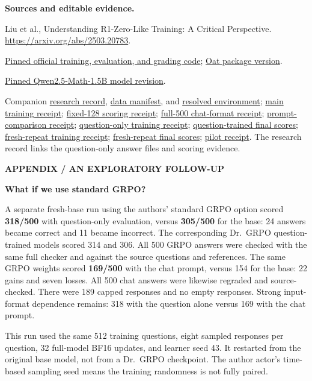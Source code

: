 \documentclass[11pt]{article}
\newcommand{\pagetitle}[2]{{\small\color{accent}\textbf{#1}}\par
  {\LARGE\color{ink}\textbf{#2}}\par\medskip}
\begin{document}
\smallskip
{\footnotesize
\textbf{Sources and editable evidence.}\par
[1] Liu et al., Understanding R1-Zero-Like Training: A Critical Perspective.
\url{https://arxiv.org/abs/2503.20783}.\par
[2] \href{https://github.com/sail-sg/understand-r1-zero/tree/dfca49dd460ee7cc8e4a5a162c876a7fd6993b87}{Pinned official training, evaluation, and grading code};
\href{https://pypi.org/project/oat-llm/0.1.3.post1/}{Oat package version}.\par
[3] \href{https://huggingface.co/Qwen/Qwen2.5-Math-1.5B/tree/4a83ca6e4526a4f2da3aa259ec36c259f66b2ab2}{Pinned Qwen2.5-Math-1.5B model revision}.\par
[4] Companion \href{README.md}{research record},
\href{data-manifest.json}{data manifest}, and
\href{requirements-resolved.txt}{resolved environment};
\href{subset512-training-receipt.json}{main training receipt};
\href{fixed128-scoring-receipt.json}{fixed-128 scoring receipt};
\href{full500-scoring-receipt.json}{full-500 chat-format receipt};
\href{prompt-control-scoring-receipt.json}{prompt-comparison receipt};
\href{question-only-training-receipt.json}{question-only training receipt};
\href{question-only-final-scoring-receipt.json}{question-trained final scores};
\href{question-only-repeat-training-receipt.json}{fresh-repeat training receipt};
\href{question-only-repeat-scoring-receipt.json}{fresh-repeat final scores};
\href{pilot-scoring-receipt.json}{pilot receipt}.
The research record links the question-only answer files and scoring evidence.
}
\newpage
\pagetitle{APPENDIX / AN EXPLORATORY FOLLOW-UP}{What if we use standard GRPO?}

A separate fresh-base run using the authors' standard GRPO option scored
\textbf{318/500} with question-only evaluation, versus \textbf{305/500} for
the base: 24 answers became correct and 11 became incorrect. The corresponding
Dr.\ GRPO question-trained models scored 314 and 306. All 500 GRPO answers
were checked with the same full checker and against the source questions and
references. The same GRPO weights scored \textbf{169/500} with the chat prompt,
versus 154 for the base: 22 gains and seven losses. All 500 chat answers were
likewise regraded and source-checked. There were 189 capped responses and no
empty responses. Strong input-format dependence remains: 318 with the question
alone versus 169 with the chat prompt.

This run used the same 512 training questions, eight sampled responses per
question, 32 full-model BF16 updates, and learner seed 43. It restarted from
the original base model, not from a Dr.\ GRPO checkpoint. The author actor's
time-based sampling seed means the training randomness is not fully paired.
\end{document}
